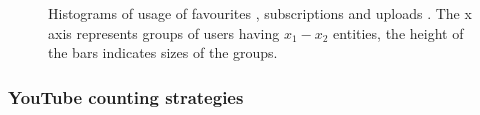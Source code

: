 \documentclass{article}
\begin{document}
\begin{figure}[ht]
\centering
{}
\label{fig:subfigureExample}
\caption{Histograms of usage of favourites , subscriptions
 and uploads . The x axis represents groups of
users having $x_1-x_2$ entities, the height of the bars indicates sizes of the
groups.}
\end{figure}

\subsubsection{YouTube counting strategies}
\end{document}
